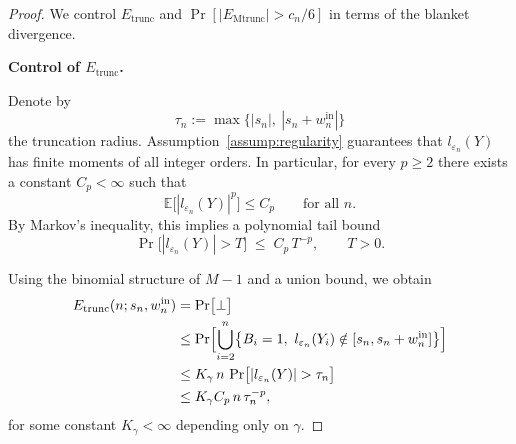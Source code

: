 \documentclass{article}
\theoremstyle{plain}
\theoremstyle{definition}
\begin{document}
\begin{proof}
We control $E_{\mathrm{trunc}}$ and $\Pr[|E_{\mathrm{Mtrunc}}|>c_n/6]$
in terms of the blanket divergence.


\medskip

\textbf{Control of $E_{\mathrm{trunc}}$.}

Denote by
\[
  \tau_n := \max\{|s_n|,\ |s_n+w_n^{\mathrm{in}}|\}
\]
the truncation radius.
Assumption~\ref{assump:regularity} guarantees that $l_{\varepsilon_n}(Y)$
has finite moments of all integer orders.
In particular, for every $p\ge2$ there exists a constant
$C_p<\infty$ such that
\[
  \mathbb E\bigl[|l_{\varepsilon_n}(Y)|^p\bigr] \le C_p
  \qquad\text{for all }n.
\]
By Markov's inequality, this implies a polynomial tail bound
\begin{equation}
  \label{eq:ell-poly-tail}
  \Pr\bigl[|l_{\varepsilon_n}(Y)|>T\bigr]
  \;\le\;
  C_p\,T^{-p},
  \qquad T>0.
\end{equation}

Using the binomial structure of $M-1$ and a union bound, we obtain
\begin{align}
  E_{\mathrm{trunc}}(n;s_n,w_n^{\mathrm{in}})
  &=
  \Pr\bigl[\perp\bigr]
  \notag\\
  &\le
  \Pr\Bigl[
    \bigcup_{i=2}^n
    \bigl\{B_i=1,\ l_{\varepsilon_n}(Y_i)\notin[s_n,s_n+w_n^{\mathrm{in}}]\bigr\}
  \Bigr]
  \notag\\
  &\le
  K_\gamma\,n\,
  \Pr\bigl[|l_{\varepsilon_n}(Y)|>\tau_n\bigr]
  \notag\\
  &\le
  K_\gamma C_p\,n\,\tau_n^{-p},
  \label{eq:Etrunc-poly-bound}
\end{align}
for some constant $K_\gamma<\infty$ depending only on $\gamma$.


\end{proof}
\end{document}
